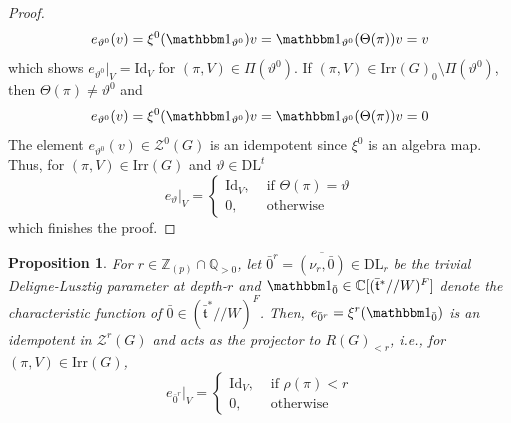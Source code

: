 \documentclass[11 pt]{article}
\numberwithin{equation}{subsection}
\newtheorem{proposition}[theorem]{Proposition}
\theoremstyle{definition}
\theoremstyle{remark}
\theoremstyle{conjecture}
\newcommand{\bt}{\bar{\mathfrak t}}
\newcommand{\Irr}{\mathrm{Irr}}
\newcommand{\DL}{\mathrm{DL}}
\newcommand{\Id}{\mathrm{Id}}
\newcommand{\mbm}{\mathbbm}
\newcommand{\Z}{\mathbb Z}
\newcommand{\Q}{\mathbb Q}
\newcommand{\C}{\mathbb C}
\newcommand{\ZZ}{\mathcal{Z}}
\begin{document}
\begin{proof}
\begin{equation*}
       e_{\vartheta^0}(v) = \xi^0(\mbm 1_{\vartheta^0})v= \mbm 1_{\vartheta^0}(\Theta(\pi))v= v
    \end{equation*}
    which shows $e_{\vartheta^0}|_V= \Id_V$ for $(\pi,V)\in \Pi(\vartheta^0)$. If $(\pi,V)\in \Irr(G)_0 \setminus\Pi(\vartheta^0)$, then $\Theta(\pi)\neq \vartheta^0$ and 
    \begin{equation*}
         e_{\vartheta^0}(v) = \xi^0(\mbm 1_{\vartheta^0})v= \mbm 1_{\vartheta^0}(\Theta(\pi))v= 0
    \end{equation*}
    The element $e_{\vartheta^0}(v) \in \ZZ^0(G)$ is an idempotent since $\xi^0$ is an algebra map. Thus, for $(\pi,V)\in \Irr(G)$ and $\vartheta \in \DL^t$
    \begin{equation*}
        e_{\vartheta}|_V=\begin{cases}
        \mathrm{Id}_V, & \text{ if }  \Theta(\pi)=\vartheta\\
        0, & \text{ otherwise}
    \end{cases}
    \end{equation*}
    which finishes the proof. 
\end{proof}
\begin{proposition}\label{prop:depth<r projector}
      For $r \in \Z_{(p)}\cap \Q_{>0}$, let $\bar 0^r=\overline{(\nu_r, \bar0)} \in \DL_r$ be the trivial Deligne-Lusztig parameter at depth-$r$ and $\mbm 1_{\bar 0} \in \C[(\bt^*//W)^F]$ denote the characteristic function of $\bar0 \in (\bt^*//W)^F$. Then, $e_{\bar 0^r}= \xi^r( \mbm 1_{\bar 0})$  is an idempotent in $\ZZ^r(G)$ and acts as the projector to $R(G)_{<r}$, i.e., for $(\pi,V)\in \Irr(G)$, 
    \begin{equation*}
        e_{\bar 0^r}|_V=\begin{cases}
        \mathrm{Id}_V, & \text{ if } \rho(\pi)< r \\
        0, & \text{ otherwise}
    \end{cases}
    \end{equation*}
\end{proposition}
\end{document}
